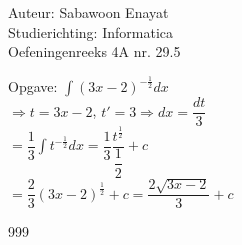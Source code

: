 \documentclass[a4paper]{article}
\begin{document}
  
\noindent \large Auteur: Sabawoon Enayat \\
\noindent \large Studierichting: Informatica\\
\noindent \large Oefeningenreeks 4A nr. 29.5 \\

\newcommand{\dint}{\displaystyle\int}

\medskip

\normalsize

Opgave: $\dint (3x - 2)^{-\tfrac{1}{2}} dx$\\

$\Rightarrow t = 3x - 2$, $t' = 3 \Rightarrow dx = \dfrac{dt}{3}$\\

$= \dfrac{1}{3}\dint t^{-\tfrac{1}{2}} dx = \dfrac{1}{3}\dfrac{t^{\tfrac{1}{2}}}{\dfrac{1}{2}} + c$\\

$= \dfrac{2}{3}(3x - 2)^{\tfrac{1}{2}} + c = \dfrac{2 \sqrt{3x - 2}}{3} + c$\\

\begin{thebibliography}{999}
\end{thebibliography}
\end{document}
